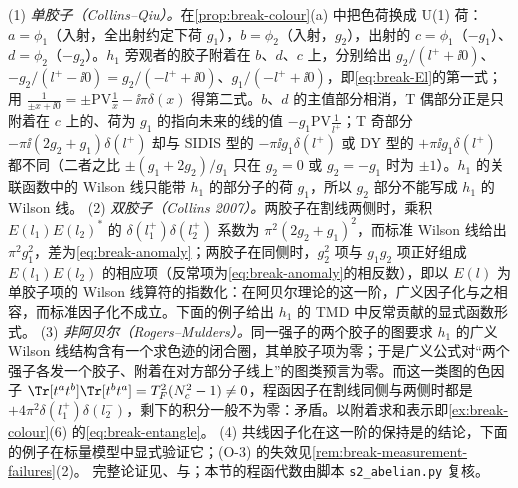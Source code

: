 \begin{proofsketch}
(1) \emph{单胶子（Collins--Qiu）。}在\cref{prop:break-colour}(a) 中把色荷换成 U(1) 荷：$a=\phi_1$（入射，全出射约定下荷 $g_1$），$b=\phi_2$（入射，$g_2$），出射的 $c=\phi_1$（$-g_1$）、$d=\phi_2$（$-g_2$）。$h_1$ 旁观者的胶子附着在 $b$、$d$、$c$ 上，分别给出 $g_2/(l^++\ii0)$、$-g_2/(l^+-\ii0)=g_2/(-l^++\ii0)$、$g_1/(-l^++\ii0)$，即\cref{eq:break-El}的第一式；用 $\frac1{\pm x+\ii0}=\pm\mathrm{PV}\frac1x-\ii\pi\delta(x)$ 得第二式。$b$、$d$ 的主值部分相消，T 偶部分正是只附着在 $c$ 上的、荷为 $g_1$ 的指向未来的线的值 $-g_1\mathrm{PV}\frac1{l^+}$；T 奇部分 $-\pi\ii(2g_2+g_1)\delta(l^+)$ 却与 SIDIS 型的 $-\pi\ii g_1\delta(l^+)$ 或 DY 型的 $+\pi\ii g_1\delta(l^+)$ 都不同（二者之比 $\pm(g_1+2g_2)/g_1$ 只在 $g_2=0$ 或 $g_2=-g_1$ 时为 $\pm1$）。$h_1$ 的关联函数中的 Wilson 线只能带 $h_1$ 的部分子的荷 $g_1$，所以 $g_2$ 部分不能写成 $h_1$ 的 Wilson 线\cite{CollinsQiu2007}。
(2) \emph{双胶子（Collins 2007）。}两胶子在割线两侧时，乘积 $E(l_1)E(l_2)^*$ 的 $\delta(l_1^+)\delta(l_2^+)$ 系数为 $\pi^2(2g_2+g_1)^2$，而标准 Wilson 线给出 $\pi^2g_1^2$，差为\cref{eq:break-anomaly}；两胶子在同侧时，$g_2^2$ 项与 $g_1g_2$ 项正好组成 $E(l_1)E(l_2)$ 的相应项（反常项为\cref{eq:break-anomaly}的相反数），即以 $E(l)$ 为单胶子项的 Wilson 线算符的指数化\cite[式~(7)(8)]{Collins2007}：在阿贝尔理论的这一阶，广义因子化与之相容，而标准因子化不成立。下面的例子给出 $h_1$ 的 TMD 中反常贡献的显式函数形式。
(3) \emph{非阿贝尔（Rogers--Mulders）。}同一强子的两个胶子的图要求 $h_1$ 的广义 Wilson 线结构含有一个求色迹的闭合圈，其单胶子项为零\cite[式~(30)(33)]{RogersMulders2010}；于是广义公式对“两个强子各发一个胶子、附着在对方部分子线上”的图类预言为零。而这一类图的色因子 $\Tr[t^at^b]\Tr[t^bt^a]=T_F^2(N_c^2-1)\neq0$，程函因子在割线同侧与两侧时都是 $+4\pi^2\delta(l_1^+)\delta(l_2^-)$\cite[式~(34)--(36)]{RogersMulders2010}，剩下的积分一般不为零：矛盾。以附着求和表示即\cref{ex:break-colour}(6) 的\cref{eq:break-entangle}。
(4) 共线因子化在这一阶的保持是\cite{Collins2007}的结论，下面的例子在标量模型中显式验证它；(O-3) 的失效见\cref{rem:break-measurement-failures}(2)。
完整论证见\cite[第~IV~节]{CollinsQiu2007}、\cite{Collins2007}与\cite[第~V、VI~节]{RogersMulders2010}；本节的程函代数由脚本 \texttt{s2\_abelian.py} 复核。
\end{proofsketch}

